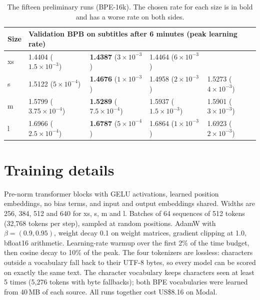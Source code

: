 \documentclass[11pt]{article}
\begin{document}
\begin{table}[H]
\centering\small
\begin{tabular}{lllll}
\toprule
Size & \multicolumn{4}{l}{Validation BPB on subtitles after 6 minutes (peak learning rate)} \\
\midrule
xs & 1.4404 ($1.5{\times}10^{-3}$) & \textbf{1.4387} ($3{\times}10^{-3}$) & 1.4464 ($6{\times}10^{-3}$) & \\
s  & 1.5122 ($5{\times}10^{-4}$) & \textbf{1.4676} ($1{\times}10^{-3}$) & 1.4958 ($2{\times}10^{-3}$) & 1.5273 ($4{\times}10^{-3}$) \\
m  & 1.5799 ($3.75{\times}10^{-4}$) & \textbf{1.5289} ($7.5{\times}10^{-4}$) & 1.5937 ($1.5{\times}10^{-3}$) & 1.5901 ($3{\times}10^{-3}$) \\
l  & 1.6966 ($2.5{\times}10^{-4}$) & \textbf{1.6787} ($5{\times}10^{-4}$) & 1.6864 ($1{\times}10^{-3}$) & 1.6923 ($2{\times}10^{-3}$) \\
\bottomrule
\end{tabular}
\caption{The fifteen preliminary runs (BPE-16k). The chosen rate for each size
is in bold and has a worse rate on both sides.}
\end{table}

\section{Training details}

Pre-norm transformer blocks with GELU activations, learned position embeddings,
no bias terms, and input and output embeddings shared. Widths are 256, 384, 512
and 640 for xs, s, m and l. Batches of 64 sequences of 512 tokens (32{,}768
tokens per step), sampled at random positions. AdamW with $\beta=(0.9, 0.95)$,
weight decay 0.1 on weight matrices, gradient clipping at 1.0, bfloat16
arithmetic. Learning-rate warmup over the first 2\% of the time budget, then
cosine decay to 10\% of the peak. The four tokenizers are lossless: characters
outside a vocabulary fall back to their UTF-8 bytes, so every model can be scored
on exactly the same text. The character vocabulary keeps characters seen at
least 5 times (5{,}276 tokens with byte fallbacks); both BPE vocabularies were
learned from 40\,MB of each source. All runs together cost US\$8.16 on Modal.
\end{document}
